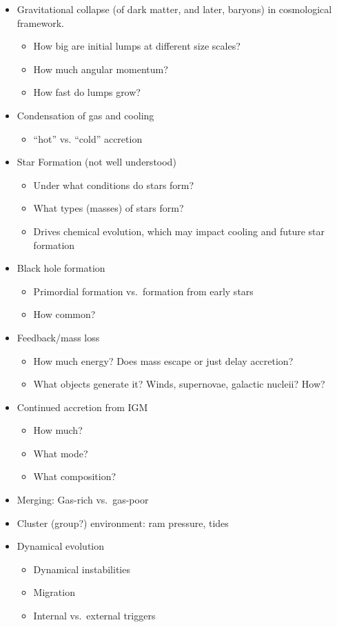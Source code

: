 \documentclass{article}
\begin{document}
\begin{itemize}
    \item Gravitational collapse (of dark matter, and later, baryons)
        in cosmological framework.
        \begin{itemize}
            \item How big are initial lumps at different size scales?
            \item How much angular momentum?
            \item How fast do lumps grow?
        \end{itemize}
    \item Condensation of gas and cooling
        \begin{itemize}
            \item ``hot'' vs. ``cold'' accretion
        \end{itemize}
    \item Star Formation (not well understood)
        \begin{itemize}
            \item Under what conditions do stars form?
            \item What types (masses) of stars form?
            \item Drives chemical evolution, which may impact
                cooling and future star formation
        \end{itemize}
    \item Black hole formation
        \begin{itemize}
            \item Primordial formation vs.\ formation from early stars
            \item How common?
        \end{itemize}
    \item Feedback/mass loss
        \begin{itemize}
            \item How much energy? Does mass escape or just delay accretion?
            \item What objects generate it? Winds, supernovae, galactic
                nucleii? How?
        \end{itemize}
    \item Continued accretion from IGM
        \begin{itemize}
            \item How much?
            \item What mode?
            \item What composition?
        \end{itemize}
    \item Merging: Gas-rich vs.\ gas-poor
    \item Cluster (group?) environment: ram pressure, tides
    \item Dynamical evolution
        \begin{itemize}
            \item Dynamical instabilities
            \item Migration
            \item Internal vs.\ external triggers
        \end{itemize}
\end{itemize}
\end{document}
